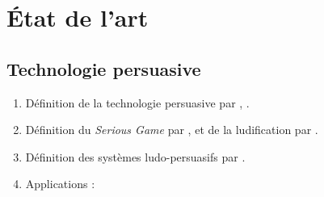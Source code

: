 \documentclass[10pt,a5paper,twoside]{article}
\begin{document}
\section{État de l'art}\label{uxe9tat-de-lart}

\subsection{Technologie persuasive}\label{technologie-persuasive}

\begin{enumerate}
\def\labelenumi{\arabic{enumi}.}
\itemsep1pt\parskip0pt
\item
  Définition de la technologie persuasive par \citet{fogg1998captology},
  \citet{fogg2002persuasive}.
\item
  Définition du \emph{Serious Game} par \citet{abt1970serious},
  \citet{ritterfeld2009serious} et de la ludification par
  \citet{deterding2011game}.
\item
  Définition des systèmes ludo-persuasifs par
  \citet{senach2015systemes}.
\item
  Applications :


\end{enumerate}
\end{document}
